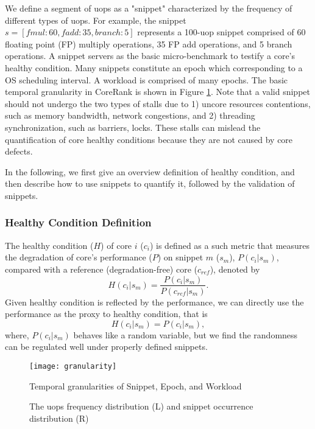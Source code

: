 We define a segment of uops as a "snippet" characterized by the frequency of different types of uops. For example, the snippet $s=[fmul:60, fadd:35, branch:5]$ represents a 100-uop snippet comprised of 60 floating point (FP) multiply operations, 35 FP add operations, and 5 branch operations. A snippet servers as the basic micro-benchmark to testify a core's healthy condition. Many snippets constitute an epoch which corresponding to a OS scheduling interval. A workload is comprised of many epochs. The basic temporal granularity in CoreRank is shown in Figure \ref{granu}. Note that a valid snippet should not undergo the two types of stalls due to 1) uncore resources contentions, such as memory bandwidth, network congestions, and 2) threading synchronization, such as barriers, locks. These stalls can mislead the quantification of core healthy conditions because they are not caused by core defects.

In the following,  we first give an overview definition of healthy condition, and then describe how to use snippets to quantify it, followed by the validation of snippets. 

\subsubsection{Healthy Condition Definition}
The healthy condition ($H$) of core $i$ ($c_i$) is defined as a such metric that measures the degradation of core's performance ($P$) on snippet $m$ ($s_m$), $P(c_i|s_m)$, compared with a reference (degradation-free) core ($c_{ref}$), denoted by
\begin{equation}
  H(c_i|s_m) = \frac{P(c_i|s_m)}{P(c_{ref}|s_m)}.\label{hdef}
\end{equation}
Given healthy condition is reflected by the performance, we can directly use the performance as the proxy to healthy condition, that is
\begin{equation}
  H({c_i|s_m}) = {P(c_i|s_m)}, \label{healthy}
\end{equation}
where, $P(c_i|s_m)$ behaves like a random variable, but we find the randomness can be regulated well under properly defined snippets.

\begin{figure}[t]
  \centering
  \texttt{[image: granularity]}\\
  \caption{Temporal granularities of Snippet, Epoch, and Workload}\label{granu}
\end{figure}


\begin{figure*}[t]
\centering
{}
\caption{The uops frequency distribution (L)  and snippet occurrence  distribution (R)}
\label{hotdist}
\end{figure*}

